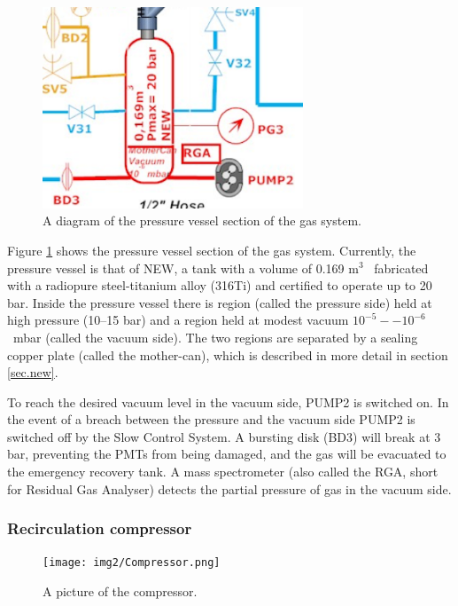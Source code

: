 \begin{figure}[hpt!]
\centering
\includegraphics[height=6cm]{img2/PVGS.png}
\caption{A diagram of the pressure vessel section of the gas system.} \label{fig.pvgs}
\end{figure}

Figure \ref{fig.pvgs} shows the pressure vessel section of the gas system. Currently, the pressure vessel is that of NEW, 
a tank with a volume of 0.169 m$^3$~ fabricated with a radiopure steel-titanium alloy (316Ti) and certified to operate up to 20 bar. Inside the pressure vessel there is region (called the pressure side) held at high pressure (10--15 bar) and a region held at modest vacuum $10^{-5}--10^{-6}$~mbar (called the vacuum side). The two regions are separated by a sealing copper plate (called the mother-can), which is described in more detail in section \ref{sec.new}. 

To reach the desired vacuum level in the vacuum side, PUMP2 is switched on. In the event of a breach between the
pressure and the vacuum side PUMP2 is switched off by the Slow Control System. A bursting disk (BD3) will break at 3 bar, preventing the PMTs from being damaged, and the gas will be evacuated to the emergency recovery tank. A mass spectrometer (also called the RGA, short for Residual Gas Analyser)
detects the partial pressure of gas in the vacuum side.


\subsubsection*{Recirculation compressor}


\begin{figure}[hpt!]
\centering
\texttt{[image: img2/Compressor.png]}
\caption{A picture of the compressor.} \label{fig.sera}
\end{figure}

